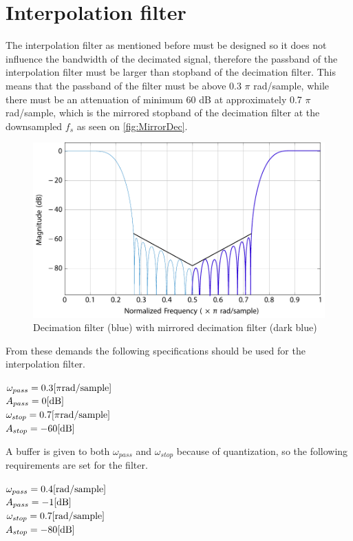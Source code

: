 \section{Interpolation filter} \label{sec:IntFilter}
The interpolation filter as mentioned before must be designed so it does not influence the bandwidth of the decimated signal, therefore the passband of the interpolation filter must be larger than stopband of the decimation filter. This means that the passband of the filter must be above 0.3 $\pi$ rad/sample, while there must be an attenuation of minimum 60 dB at approximately 0.7 $\pi$ rad/sample, which is the mirrored stopband of the decimation filter at the downsampled $f_s$ as seen on \autoref{fig:MirrorDec}. 

\begin{figure}[H]
\centering
	\includegraphics[width=\textwidth]{figures/DecIntCompMirror}
\caption{Decimation filter (blue) with mirrored decimation filter (dark blue)}
\label{fig:MirrorDec}
\end{figure}

From these demands the following specifications should be used for the interpolation filter.

$\omega_{pass}=0.3 \enhed{\pi rad/sample}$\\
$A_{pass}=0 \enhed{dB}$\\
$\omega_{stop}=0.7 \enhed{\pi rad/sample}$\\
$A_{stop}=-60 \enhed{dB}$

A buffer is given to both $\omega_{pass}$ and $\omega_{stop}$ because of quantization, so the following requirements are set for the filter.

$\omega_{pass}=0.4 \enhed{rad/sample}$\\
$A_{pass}=-1 \enhed{dB}$\\
$\omega_{stop}=0.7 \enhed{rad/sample}$\\
$A_{stop}=-80 \enhed{dB}$

